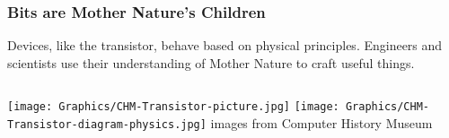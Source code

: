 
\begin{frame}
  \frametitle{Bits are Mother Nature's Children}
  Devices, like the transistor, behave based on physical principles.
  Engineers and scientists use their understanding of Mother Nature to
  craft useful things.
  
  \begin{columns}
    \texttt{[image: Graphics/CHM-Transistor-picture.jpg]}
    \texttt{[image: Graphics/CHM-Transistor-diagram-physics.jpg]}
    images from Computer History Museum~\cite{CHM-Transistor-article}
  \end{columns}

\end{frame}
